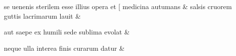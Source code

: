 \documentclass[12pt,onecolumn,twoside,a4paper]{memoir}
\begin{document}
\begin{pairs}
\begin{Leftside}
                              se
                              uenenis
                              sterilem
                              esse
                              illius
                              opera
                              et
                              [
                              medicina
                              autumans \&
                         \stanza {}
                     salsis
                              cruorem
                              guttis
                              lacrimarum
                              lauit \&
                         \stanza {}
                     
                              aut
                              saepe
                              ex
                              humili
                              sede
                              sublima
                              evolat \&
                         \stanza {}
                     
                              neque
                              ulla
                              interea
                              finis
                              curarum
                              datur
                            \&
                     
                  \endnumbering
		\end{Leftside}
                  \begin{Rightside}
			\beginnumbering
			\numberstanzafalse
                     

\end{Rightside}
\end{pairs}
\end{document}
